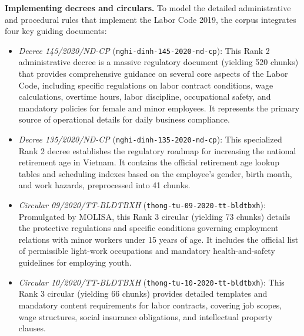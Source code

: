 \textbf{Implementing decrees and circulars.} To model the detailed administrative and procedural rules that implement the Labor Code 2019, the corpus integrates four key guiding documents:
\begin{itemize}
    \item \textit{Decree 145/2020/ND-CP} (\texttt{nghi-}\allowbreak\texttt{dinh-}\allowbreak\texttt{145-}\allowbreak\texttt{2020-}\allowbreak\texttt{nd-}\allowbreak\texttt{cp}): This Rank 2 administrative decree is a massive regulatory document (yielding 520 chunks) that provides comprehensive guidance on several core aspects of the Labor Code, including specific regulations on labor contract conditions, wage calculations, overtime hours, labor discipline, occupational safety, and mandatory policies for female and minor employees. It represents the primary source of operational details for daily business compliance.
    \item \textit{Decree 135/2020/ND-CP} (\texttt{nghi-}\allowbreak\texttt{dinh-}\allowbreak\texttt{135-}\allowbreak\texttt{2020-}\allowbreak\texttt{nd-}\allowbreak\texttt{cp}): This specialized Rank 2 decree establishes the regulatory roadmap for increasing the national retirement age in Vietnam. It contains the official retirement age lookup tables and scheduling indexes based on the employee's gender, birth month, and work hazards, preprocessed into 41 chunks.
    \item \textit{Circular 09/2020/TT-BLDTBXH} (\texttt{thong-}\allowbreak\texttt{tu-}\allowbreak\texttt{09-}\allowbreak\texttt{2020-}\allowbreak\texttt{tt-}\allowbreak\texttt{bldtbxh}): Promulgated by MOLISA, this Rank 3 circular (yielding 73 chunks) details the protective regulations and specific conditions governing employment relations with minor workers under 15 years of age. It includes the official list of permissible light-work occupations and mandatory health-and-safety guidelines for employing youth.
    \item \textit{Circular 10/2020/TT-BLDTBXH} (\texttt{thong-}\allowbreak\texttt{tu-}\allowbreak\texttt{10-}\allowbreak\texttt{2020-}\allowbreak\texttt{tt-}\allowbreak\texttt{bldtbxh}): This Rank 3 circular (yielding 66 chunks) provides detailed templates and mandatory content requirements for labor contracts, covering job scopes, wage structures, social insurance obligations, and intellectual property clauses.
\end{itemize}

